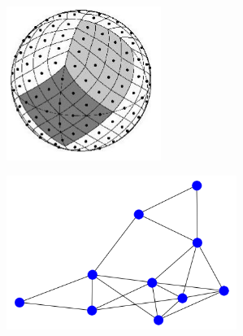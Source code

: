 \documentclass[landscape,a0paper,blockverticalspace = 5mm]{tikzposter}
\begin{document}
\begin{columns}
{{\begin{center}
\begin{minipage}{0.16\linewidth}
\begin{center}
          \end{center}
      \end{minipage} 
      \begin{minipage}{0.1\linewidth}
      \begin{center}
      
		        
         \end{center}
      \end{minipage} \hspace{0cm}
	\begin{minipage}{0.16\linewidth}
	\begin{center}
          \includegraphics[height=5cm]{figures/sphere.png}
          
        
          \end{center}
      \end{minipage} 
   \begin{minipage}{0.1\linewidth}
      \begin{center}
      
		        
         \end{center}
      \end{minipage} \hspace{0cm}
	\begin{minipage}{0.16\linewidth}
	\begin{center}
          \includegraphics[height=5cm]{figures/graph.png}
          

\end{center}
\end{minipage}
\end{center}}}
\end{columns}
\end{document}
